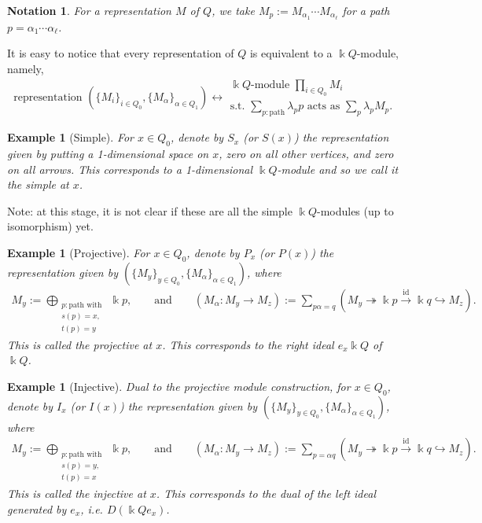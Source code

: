 \documentclass[11pt,a4paper]{article}
\numberwithin{equation}{section}
\theoremstyle{all}
\newtheorem{example}[theorem]{Example}
\newtheorem*{notation}{Notation}
\theoremstyle{remark}
\newcommand{\id}{\operatorname{id}}
\newcommand{\defn}[1]{\textsl{\color{darkblue} #1}}
\begin{document}
\begin{notation}
For a representation $M$ of $Q$, we take $M_p:=M_{\alpha_1}\cdots M_{\alpha_\ell}$ for a path $p=\alpha_1\cdots \alpha_\ell$.
\end{notation}

It is easy to notice that every representation of $Q$ is equivalent to a $\Bbbk Q$-module, namely, 
\[
\text{representation }(\{M_i\}_{i\in Q_0}, \{M_{\alpha}\}_{\alpha\in Q_1}) \leftrightarrow \begin{array}{c}\text{$\Bbbk Q$-module }\prod_{i\in Q_0} M_i \\ \text{s.t. }\sum_{p:\text{path}} \lambda_p p\text{ acts as }\sum_p \lambda_pM_p.\end{array}
\]


\begin{example}[Simple]
For $x\in Q_0$, denote by $S_x$ (or $S(x)$) the representation given by putting a 1-dimensional space on $x$, zero on all other vertices, and zero on all arrows.
This corresponds to a 1-dimensional $\Bbbk Q$-module and so we call it the \defn{simple at $x$}.
\end{example}

Note: at this stage, it is not clear if these are all the simple $\Bbbk Q$-modules (up to isomorphism) yet.

\begin{example}[Projective]
For $x\in Q_0$, denote by $P_x$ (or $P(x)$) the representation given by
$( \{M_y\}_{y\in Q_0}, \{M_\alpha\}_{\alpha\in Q_1} )$, where
\begin{align*}
M_y := \bigoplus_{\substack{p:\text{path with }\\s(p)=x,\\t(p)=y}} \Bbbk p, \qquad \text{and}\qquad 
(M_\alpha : M_y \to M_z) := \sum_{ p\alpha=q } (M_y\twoheadrightarrow \Bbbk p \xrightarrow{\id} \Bbbk q \hookrightarrow M_z).
\end{align*}
This is called the \defn{projective at $x$}.
This corresponds to the right ideal $e_x\Bbbk Q$ of $\Bbbk Q$.
\end{example}

\begin{example}[Injective]
Dual to the projective module construction, for $x\in Q_0$, denote by $I_x$ (or $I(x)$) the representation given by
$( \{M_y\}_{y\in Q_0}, \{M_\alpha\}_{\alpha\in Q_1} )$, where
\begin{align*}
M_y := \bigoplus_{\substack{p:\text{path with }\\s(p)=y,\\t(p)=x}} \Bbbk p, \qquad \text{and}\qquad 
(M_\alpha : M_y \to M_z) := \sum_{ p=\alpha q } (M_y\twoheadrightarrow \Bbbk p \xrightarrow{\id} \Bbbk q \hookrightarrow M_z).
\end{align*}
This is called the \defn{injective at $x$}.
This corresponds to the dual of the left ideal generated by $e_x$, i.e. $D(\Bbbk Q e_x)$.
\end{example}
\end{document}
